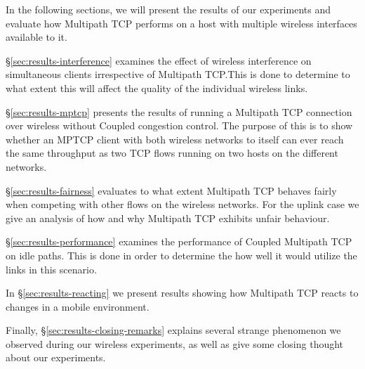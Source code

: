 In the following sections, we will present the results of our experiments and
evaluate how Multipath TCP performs on a host with multiple wireless
interfaces available to it.

\S\ref{sec:results-interference} examines the effect of wireless
interference on simultaneous clients irrespective of Multipath TCP.\@ This is
done to determine to what extent this will affect the quality of the individual
wireless links.

\S\ref{sec:results-mptcp} presents the results of running a Multipath TCP
connection over wireless without Coupled congestion control. The purpose of this
is to show whether an MPTCP client with both wireless networks to itself can
ever reach the same throughput as two TCP flows running on two hosts on
the different networks.

\S\ref{sec:results-fairness} evaluates to what extent Multipath TCP behaves
fairly when competing with other flows on the wireless networks. For the uplink
case we give an analysis of how and why Multipath TCP exhibits unfair behaviour.

\S\ref{sec:results-performance} examines the performance of Coupled Multipath 
TCP on idle paths. This is done in order to determine the how well it would 
utilize the links in this scenario.

In \S\ref{sec:results-reacting} we present results showing how Multipath TCP 
reacts to changes in a mobile environment.

Finally, \S\ref{sec:results-closing-remarks} explains several strange phenomenon
we observed during our wireless experiments, as well as give some closing
thought about our experiments.
